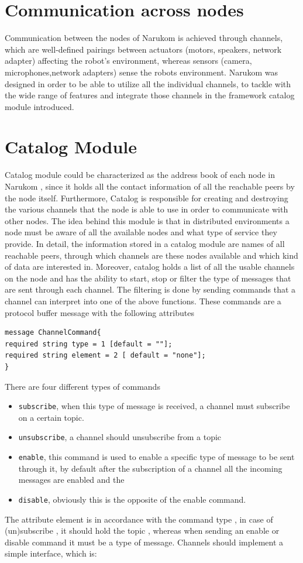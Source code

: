 \section{Communication across nodes}
Communication between the nodes of Narukom is achieved through channels, which are  well-defined pairings between actuators (motors, speakers, network adapter) affecting the robot's environment, whereas  sensors (camera, microphones,network adapters) sense the robots environment. Narukom was designed in order to be able to utilize all the individual channels, to tackle with the wide range of features and integrate those channels in the framework catalog module introduced.

\section{Catalog Module}
Catalog module could be characterized as the address book of each node in Narukom , since it holds all the contact information of all the reachable peers by the node itself. Furthermore, Catalog is responsible for creating and destroying the various channels that the node is able to use in order to communicate with other nodes.  The idea behind this module is that in distributed environments a node must be aware of all the available nodes and what type of service they provide. In detail,  the information  stored in a catalog module are names of all reachable peers, through which channels are these nodes available and which kind of data are interested in. Moreover, catalog holds a list of all the usable channels on the node and has the ability to start, stop or filter the type of messages that are sent through each channel. The filtering is done by sending commands that a channel can interpret into one of the above functions. These commands are a protocol buffer message with the following attributes
\begin{verbatim}
message ChannelCommand{
required string type = 1 [default = ""];
required string element = 2 [ default = "none"];
}
\end{verbatim} 
There are four different types of commands
\begin{itemize}
\item{\tt subscribe}, when this type of message is received, a channel must subscribe on a certain topic.
\item{\tt unsubscribe}, a channel should unsubscribe from a topic
\item{\tt enable}, this command is used to enable a specific type of message to be sent through it, by default after the subscription of a channel all the incoming messages are enabled and the
\item{\tt disable}, obviously this is the opposite of the enable command.
\end{itemize}
The attribute element is in accordance with the command type , in case of (un)subscribe , it should hold the topic , whereas when sending an enable or disable command it must be a type of message. Channels should implement a simple interface, which is:

